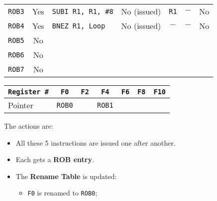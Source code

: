 \begin{examplebox}
\begin{itemize}
\begin{center}
\begin{adjustbox}{width={.92\textwidth},totalheight={\textheight},keepaspectratio}
\begin{tabular}{@{} c | c | l | l | c | c | c @{}}
                    \texttt{ROB3}       & Yes               & \texttt{SUBI R1, R1, \#8} & No (issued)           & \texttt{R1}           & $-$                   & No                \\ [.3em]
                    \texttt{ROB4}       & Yes               & \texttt{BNEZ R1, Loop}    & No (issued)           & $-$                   & $-$                   & No                \\ [.3em]
                    \texttt{ROB5}       & No                &                           &                       &                       &                       &                   \\ [.3em]
                    \texttt{ROB6}       & No                &                           &                       &                       &                       &                   \\ [.3em]
                    \texttt{ROB7}       & No                &                           &                       &                       &                       &                   \\
                    \bottomrule
                \end{tabular}
            \end{adjustbox}
            \begin{tabular}{@{} l | c c c c c c @{}}
                \toprule
                \texttt{Register \#}    & \texttt{F0}   & \texttt{F2}   & \texttt{F4}   & \texttt{F6}   & \texttt{F8}   & \texttt{F10}  \\
                \midrule
                Pointer                 & \texttt{ROB0} &               & \texttt{ROB1} &               &               &               \\
                \bottomrule
            \end{tabular}
        \end{center}
        The actions are:
        \begin{itemize}
            \item All these 5 instructions are issued one after another.
            \item Each gets a \textbf{ROB entry}.
            \item The \textbf{Rename Table} is updated:
            \begin{itemize}
                \item \texttt{F0} is renamed to \texttt{ROB0};

\end{itemize}
\end{itemize}
\end{itemize}
\end{examplebox}
